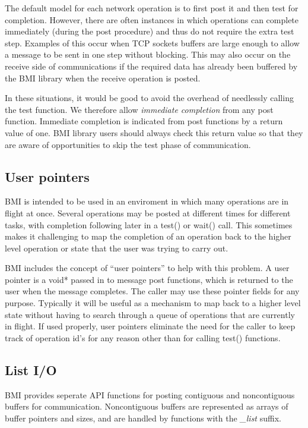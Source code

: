 \documentclass[11pt]{article}
\begin{document}
The default model for each network operation is to first post it and
then test for completion.  However, there are often instances in which
operations can complete immediately (during the post procedure) and thus
do not require the extra test step.  Examples of this occur when TCP
sockets buffers are large enough to allow a message to be sent in one step
without blocking.  This may also occur on the receive side of
communications if the required data has already been buffered by the BMI
library when the receive operation is posted.

In these situations, it would be good to avoid the overhead of
needlessly calling the test function.  We therefore allow
\emph{immediate completion} from any post function.  Immediate
completion is indicated from post functions by a return value of one.
BMI library users should always check this return value so that they are
aware of opportunities to skip the test phase of communication.

\subsection{User pointers}

BMI is intended to be used in an enviroment in which many
operations are in flight at once.  Several
operations may be posted at different times for different tasks,
with completion following later in a test() or wait() call.
This sometimes makes it challenging to map the completion of an
operation back to the higher level operation or state that the
user was trying to carry out.

BMI includes the concept of ``user pointers'' to help with this
problem.  A user pointer is a void* passed in to message post
functions, which is returned to the user when the message
completes.  The caller may use these pointer fields for any
purpose.  Typically it will be useful as a mechanism to map back
to a higher level state without having to search through a queue
of operations that are currently in flight.  If used properly,
user pointers eliminate the need for the caller to keep track of
operation id's for any reason other than for calling test()
functions.

\subsection{List I/O}

BMI provides seperate API functions for posting contiguous and
noncontiguous buffers for communication.   Noncontiguous buffers
are represented as arrays of buffer pointers and sizes, and are
handled by functions with the \emph{\_list} suffix.
\end{document}
